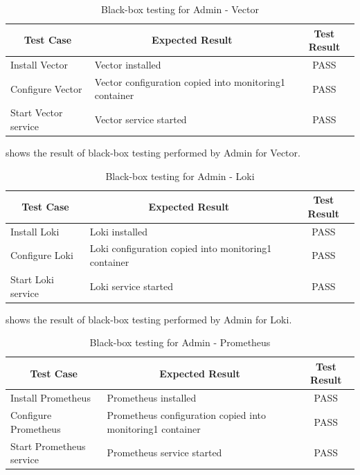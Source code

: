 \documentclass[../index.tex]{subfiles}
\begin{document}
\begin{table}[h!]
  \begin{tabularx}{\textwidth}{|m{8em}|X|c|} 
    \hline
    \multicolumn{1}{|c|}{Test Case} & \multicolumn{1}{c|}{Expected Result} & \multicolumn{1}{c|}{Test Result} \\
    \hline
    Install Vector                  & Vector installed                     & PASS \\ 
    Configure Vector                & Vector configuration copied into monitoring1 container & PASS \\
    Start Vector service            & Vector service started               & PASS \\ 
    \hline
  \end{tabularx}
  \caption{Black-box testing for Admin - Vector}
  \label{table:blackbox_vector}
\end{table}

 shows the result of black-box testing performed by Admin for Vector.

\begin{table}[h!]
  \begin{tabularx}{\textwidth}{|m{8em}|X|c|} 
    \hline
    \multicolumn{1}{|c|}{Test Case} & \multicolumn{1}{c|}{Expected Result} & \multicolumn{1}{c|}{Test Result} \\
    \hline
    Install Loki                    & Loki installed                       & PASS \\ 
    Configure Loki                  & Loki configuration copied into monitoring1 container & PASS \\
    Start Loki service              & Loki service started                 & PASS \\ 
    \hline
  \end{tabularx}
  \caption{Black-box testing for Admin - Loki}
  \label{table:blackbox_loki}
\end{table}

 shows the result of black-box testing performed by Admin for Loki.

\newpage

\begin{table}[h!]
  \begin{tabularx}{\textwidth}{|m{12em}|X|c|} 
    \hline
    \multicolumn{1}{|c|}{Test Case} & \multicolumn{1}{c|}{Expected Result} & \multicolumn{1}{c|}{Test Result} \\
    \hline
    Install Prometheus              & Prometheus installed                 & PASS \\ 
    Configure Prometheus            & Prometheus configuration copied into monitoring1 container & PASS \\
    Start Prometheus service        & Prometheus service started           & PASS \\ 
    \hline
  \end{tabularx}
  \caption{Black-box testing for Admin - Prometheus}
  \label{table:blackbox_prometheus}
\end{table}
\end{document}
